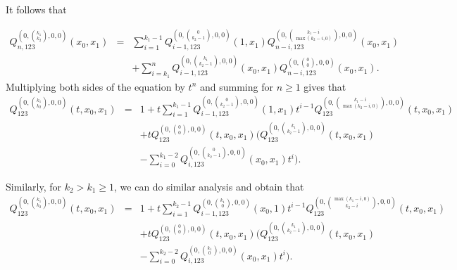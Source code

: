 \documentclass[
final,nomarks
]{dmtcs-episciences}
\newcommand{\Qmz}[2]{Q_{123}^{(0,\binom{#1}{#2},0,0)}(t,x_0,x_1)}
\newcommand{\Qmzn}[3]{Q_{#3,123}^{(0,\binom{#1}{#2},0,0)}(x_0,x_1)}
\newcommand{\Qmznx}[4]{Q_{#3,123}^{(0,\binom{#1}{#2},0,0)}(#4)}
\begin{document}
It follows that 





\begin{eqnarray}
	\Qmzn{k_1}{k_2}{n}&=&\sum_{i=1}^{k_1-1}\Qmznx{0}{k_2-1}{i-1}{1,x_1}\Qmzn{k_1-i}{\max(k_2-i,0)}{n-i}\nonumber\\
	&&+\sum_{i=k_1}^{n}\Qmzn{k_1}{k_2-1}{i-1}\Qmzn{0}{0}{n-i}. 
\end{eqnarray}
Multiplying both sides of the equation by \begin{math}t^n\end{math} and summing for \begin{math}n\geq 1\end{math} gives that
\begin{eqnarray}
	\Qmz{k_1}{k_2}&=&1+t\sum_{i=1}^{k_1-1}\Qmznx{0}{k_2-1}{i-1}{1,x_1}t^{i-1}\Qmz{k_1-i}{\max(k_2-i,0)}\nonumber\\\nonumber
	&&+t \Qmz{0}{0}(\Qmz{k_1}{k_2-1}\\
	&&-\sum_{i=0}^{k_1-2}\Qmzn{0}{k_2-1}{i}t^i). 
\end{eqnarray}

Similarly, for \begin{math}k_2>k_1\geq 1\end{math}, we can do similar analysis and obtain that
\begin{eqnarray}
	\Qmz{k_1}{k_2}&=&1+t\sum_{i=1}^{k_2-1}\Qmznx{k_1}{0}{i-1}{x_0,1}t^{i-1}\Qmz{\max(k_1-i,0)}{k_2-i}\nonumber\\\nonumber
	&&+t \Qmz{0}{0}(\Qmz{k_1}{k_2-1}\\
	&&-\sum_{i=0}^{k_2-2}\Qmzn{k_1}{0}{i}t^i). 
\end{eqnarray}
\end{document}
